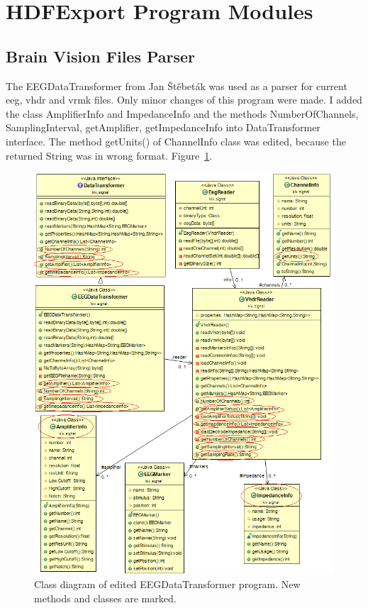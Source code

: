 \section{HDFExport Program Modules}

\subsection{Brain Vision Files Parser}
The EEGDataTransformer from Jan Štěbeták \cite{eegloader} was used as a parser for current eeg, vhdr and vrmk files.  Only minor changes of this program were made. I added the class AmplifierInfo and ImpedanceInfo and the methods NumberOfChannels, SamplingInterval, getAmplifier, getImpedanceInfo into DataTransformer interface. The method getUnits() of ChannelInfo class was edited, because the returned String was in wrong format. Figure~\ref{eegexport}.

\begin{figure}
	\includegraphics[scale=0.75]{obrazky/EEGExport.png}
	\caption{Class diagram of edited EEGDataTransformer program. New methods and classes are marked.}
	\label{eegexport}
	
\end{figure}

